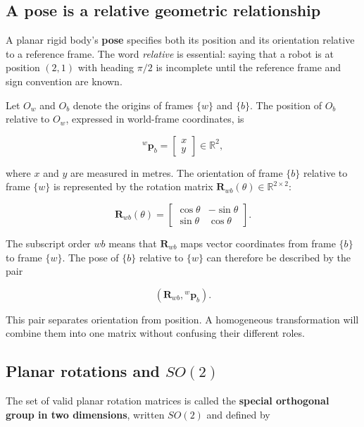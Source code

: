 \documentclass[
  australian,
  12pt,
  letterpaper,
  DIV=11,
  numbers=noendperiod,
  twoside]{scrreprt}
\begin{document}
\subsection{A pose is a relative geometric
relationship}\label{a-pose-is-a-relative-geometric-relationship}

A planar rigid body's \textbf{pose} specifies both its position and its
orientation relative to a reference frame. The word \emph{relative} is
essential: saying that a robot is at position \((2,1)\) with heading
\(\pi/2\) is incomplete until the reference frame and sign convention
are known.

Let \(O_w\) and \(O_b\) denote the origins of frames \(\{w\}\) and
\(\{b\}\). The position of \(O_b\) relative to \(O_w\), expressed in
world-frame coordinates, is

\[
{}^{w}\mathbf p_b
=
\begin{bmatrix}
x\\
y
\end{bmatrix}
\in\mathbb R^2,
\]

where \(x\) and \(y\) are measured in metres. The orientation of frame
\(\{b\}\) relative to frame \(\{w\}\) is represented by the rotation
matrix \(\mathbf R_{wb}(\theta)\in\mathbb R^{2\times2}\):

\[
\mathbf R_{wb}(\theta)
=
\begin{bmatrix}
\cos\theta&-\sin\theta\\
\sin\theta&\cos\theta
\end{bmatrix}.
\]

The subscript order \(wb\) means that \(\mathbf R_{wb}\) maps vector
coordinates from frame \(\{b\}\) to frame \(\{w\}\). The pose of
\(\{b\}\) relative to \(\{w\}\) can therefore be described by the pair

\[
\left(\mathbf R_{wb},{}^{w}\mathbf p_b\right).
\]

This pair separates orientation from position. A homogeneous
transformation will combine them into one matrix without confusing their
different roles.

\subsection{\texorpdfstring{Planar rotations and
\(SO(2)\)}{Planar rotations and SO(2)}}\label{sec-se2-planar-rotations}

The set of valid planar rotation matrices is called the \textbf{special
orthogonal group in two dimensions}, written \(SO(2)\) and defined by
\end{document}
